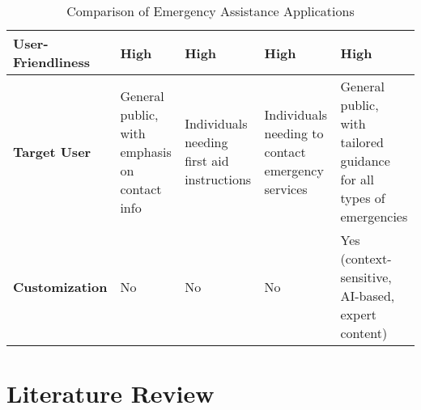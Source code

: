 \begin{table}[htp]
\begin{tabular}{|p{2cm}|p{2cm}|p{2cm}|p{2cm}|p{2cm}|}
\textbf{User-Friendliness}                  & High                                              & High                                          & High                                           & High                                             \\ \hline
\textbf{Target User}                        & General public, with emphasis on contact info     & Individuals needing first aid instructions   & Individuals needing to contact emergency services & General public, with tailored guidance for all types of emergencies \\ \hline
\textbf{Customization}      & No                                                & No                                            & No                                             & Yes (context-sensitive, AI-based, expert content) \\ \hline
\end{tabular}
\caption{Comparison of Emergency Assistance Applications}
\label{tab:competitor-analysis}
\end{table}
    
\section{Literature Review}
\label{section:literature-review}




